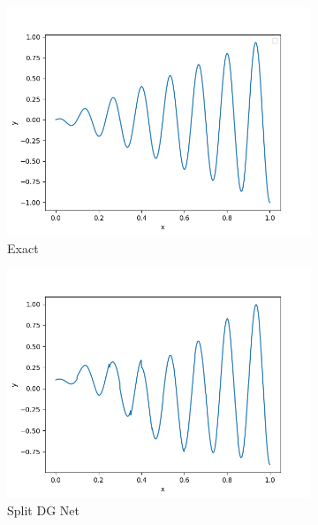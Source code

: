 \begin{figure}[H]
    \centering  
    \begin{subfigure}{0.5\textwidth}  
        \centering  
        \includegraphics[width=0.9\linewidth]{./pics/final/possion/dgnet1d/15piexact.png}  
        \caption{Exact}  
    \end{subfigure}%
    \begin{subfigure}{0.5\textwidth}  
        \centering  
        \includegraphics[width=0.9\linewidth]{./pics/final/possion/dgnet1d/15pi2ltrunk.png}  
        \caption{Split DG Net}
    \end{subfigure}  
    \begin{subfigure}{0.45\textwidth}  
        \centering  

\end{subfigure}
\end{figure}
